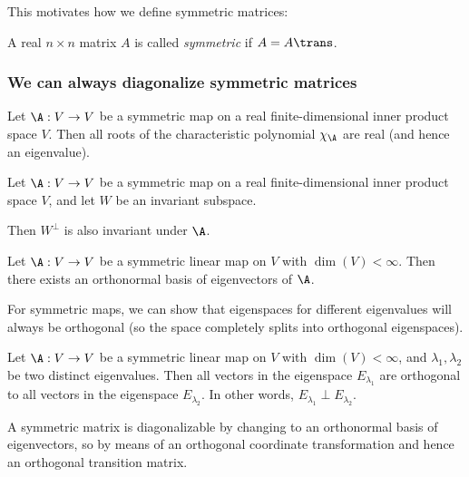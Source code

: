 This motivates how we define symmetric matrices:
\begin{definition}
    A real $n \times n$ matrix $A$ is called \emph{symmetric} if $A = A\trans$.
\end{definition}

\subsubsection*{We can always diagonalize symmetric matrices}
\begin{theorem}
    Let $\A:V \to V$ be a symmetric map on a real finite-dimensional inner product space $V$. Then all roots of the
    characteristic polynomial $\chi_\A$ are real (and hence an eigenvalue).
\end{theorem}

\begin{theorem}
    Let $\A: V \to V$ be a symmetric map on a real finite-dimensional inner product space $V$, and let $W$ be an invariant
    subspace.
    
    Then $W^\perp$ is also invariant under $\A$.
\end{theorem}

\begin{theorem}
    Let $\A: V \to V$ be a symmetric linear map on $V$ with $\dim(V) < \infty$. Then there exists an orthonormal basis
    of eigenvectors of $\A$.
\end{theorem}

For symmetric maps, we can show that eigenspaces for different eigenvalues will always be orthogonal (so the space completely
splits into orthogonal eigenspaces).

\begin{theorem}
    Let $\A:V \to V$ be a symmetric linear map on $V$ with $\dim(V) < \infty$, and $\lambda_1, \lambda_2$ be two distinct
    eigenvalues. Then all vectors in the eigenspace $E_{\lambda_1}$ are orthogonal to all vectors in the eigenspace
    $E_{\lambda_2}$. In other words, $E_{\lambda_1} \perp E_{\lambda_2}$.
\end{theorem}

\begin{corollary}
    A symmetric matrix is diagonalizable by changing to an orthonormal basis of eigenvectors, so by means of an orthogonal
    coordinate transformation and hence an orthogonal transition matrix.
\end{corollary}

